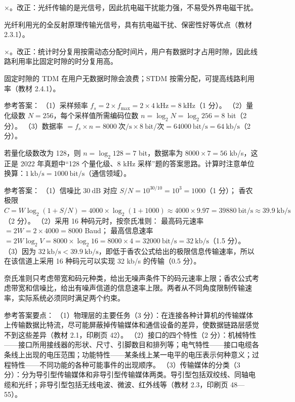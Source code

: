 \documentclass[a4paper,11pt]{article}
\begin{document}
\q ×。改正：光纤传输的是光信号，因此抗电磁干扰能力强，不易受外界电磁干扰。\begin{analysis}光纤利用光的全反射原理传输光信号，具有抗电磁干扰、保密性好等优点（教材 2.3.1）。\end{analysis}

\q ×。改正：统计时分复用按需动态分配时间片，用户有数据时才占用时隙，因此线路利用率比固定时隙的时分复用高。\begin{analysis}固定时隙的 TDM 在用户无数据时隙会浪费；STDM 按需分配，可提高线路利用率（教材 2.4.1）。\end{analysis}


\q 参考答案：
（1）采样频率 $f_s=2\times f_{\max}=2\times4\ \text{kHz}=8\ \text{kHz}$（1 分）。
（2）量化级数 $N=256$，每个采样值所需编码位数 $n=\log_2 N=\log_2 256=8$ bit（2 分）。
（3）数据率 $=f_s\times n=8000\ \text{次/s}\times8\ \text{bit/次}=64000\ \text{bit/s}=64\ \text{kb/s}$（2 分）。
\begin{analysis}若量化级数改为 128，则 $n=\log_2 128=7$ bit，数据率为 $8000\times7=56$ kb/s，这正是 2022 年真题中“128 个量化级、8 kHz 采样”题的答案思路。计算时注意单位换算：$1\ \text{kb/s}=1000\ \text{bit/s}$（通信领域）。\end{analysis}

\q 参考答案：
（1）信噪比 $30\ \text{dB}$ 对应 $S/N=10^{30/10}=10^{3}=1000$（1 分）；
香农极限 $C=W\log_2(1+S/N)=4000\times\log_2(1+1000)\approx4000\times9.97=39880\ \text{bit/s}\approx39.9\ \text{kb/s}$（2 分）。
（2）采用 16 种码元时，按奈氏准则：
最高码元速率 $=2W=2\times4000=8000$ Baud；
最高信息速率 $=2W\log_2 V=8000\times\log_2 16=8000\times4=32000\ \text{bit/s}=32\ \text{kb/s}$（1.5 分）。
（3）因为 $32\ \text{kb/s}<39.9\ \text{kb/s}$，即低于香农公式给出的极限信息传输速率，所以在该信道上采用 16 种码元可以实现 32 kb/s 的传输（0.5 分）。
\begin{analysis}奈氏准则只考虑带宽和码元种类，给出无噪声条件下的码元速率上限；香农公式考虑带宽和信噪比，给出有噪声信道的信息速率上限。两者从不同角度限制传输速率，实际系统必须同时满足两个约束。\end{analysis}


\q 参考答案要点：
（1）物理层的主要任务（3 分）：在连接各种计算机的传输媒体上传输数据比特流，尽可能屏蔽掉传输媒体和通信设备的差异，使数据链路层感觉不到这些差异（教材 2.1，印刷页 42）。
（2）接口的四个特性（2 分）：机械特性——接口所用接线器的形状、尺寸、引脚数目和排列等；电气特性——接口电缆各条线上出现的电压范围；功能特性——某条线上某一电平的电压表示何种意义；过程特性——不同功能的各种可能事件的出现顺序。
（3）传输媒体的分类（3 分）：分为导引型传输媒体和非导引型传输媒体两类。导引型包括双绞线、同轴电缆和光纤；非导引型包括无线电波、微波、红外线等（教材 2.3，印刷页 48—55）。
\end{document}
